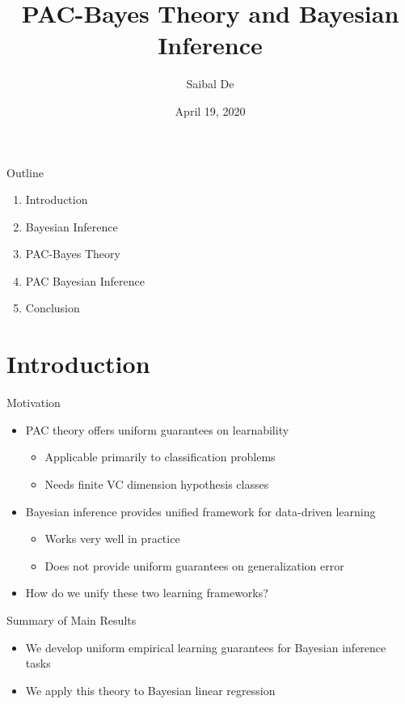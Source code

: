 \documentclass[aspectratio=169]{beamer}
\title{PAC-Bayes Theory and Bayesian Inference}
\author{Saibal De}
\date{April 19, 2020}
\begin{document}
\begin{frame}
  \titlepage
\end{frame}

\begin{frame}{Outline}
  \begin{enumerate}
    \item
      Introduction
    \item
      Bayesian Inference
    \item
      PAC-Bayes Theory
    \item
      PAC Bayesian Inference
    \item
      Conclusion
  \end{enumerate}
\end{frame}

\section{Introduction}

\begin{frame}{Motivation}
  \begin{itemize}
  	\item
      PAC theory offers uniform guarantees on learnability
      \begin{itemize}
        \item
          Applicable primarily to classification problems
        \item
          Needs finite VC dimension hypothesis classes
      \end{itemize}
  	\item
      Bayesian inference provides unified framework for data-driven learning
      \begin{itemize}
        \item
          Works very well in practice
        \item
          Does not provide uniform guarantees on generalization error
      \end{itemize}
  	\item
      How do we unify these two learning frameworks?
  \end{itemize}
\end{frame}

\begin{frame}{Summary of Main Results}
	\begin{itemize}
		\item
      We develop uniform empirical learning guarantees for Bayesian inference
      tasks
    \item
      We apply this theory to Bayesian linear regression
	\end{itemize}
\end{frame}
\end{document}
